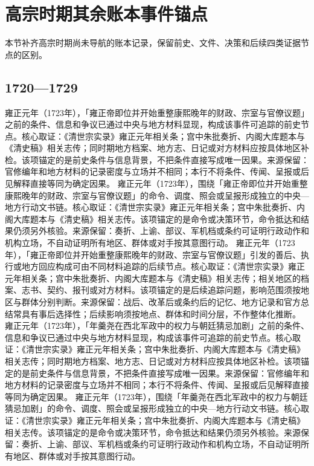 \section{高宗时期其余账本事件锚点}
本节补齐高宗时期尚未导航的账本记录，保留前史、文件、决策和后续四类证据节点的区别。
\subsection{1720—1729}
雍正元年（1723年），「雍正帝即位并开始重整康熙晚年的财政、宗室与官僚议题」之前的条件、信息和争议已通过中央与地方材料显现，构成该事件可追踪的前史节点。核心取证：《清世宗实录》雍正元年相关条；宫中朱批奏折、内阁大库题本与《清史稿》相关志传；同时期地方档案、地方志、日记或对方材料应按具体地区补检。该项锚定的是前史条件与信息背景，不把条件直接写成唯一因果。来源保留：官修编年和地方材料的记录密度与立场并不相同；本行不将条件、传闻、呈报或后见解释直接等同为确定因果。
雍正元年（1723年），围绕「雍正帝即位并开始重整康熙晚年的财政、宗室与官僚议题」的命令、调度、照会或呈报形成独立的中央—地方行动文书链。核心取证：《清世宗实录》雍正元年相关条；宫中朱批奏折、内阁大库题本与《清史稿》相关志传。该项锚定的是命令或决策环节，命令抵达和结果仍须另外核验。来源保留：奏折、上谕、部议、军机档或条约可证明行政动作和机构立场，不自动证明所有地区、群体或对手按其意图行动。
雍正元年（1723年），「雍正帝即位并开始重整康熙晚年的财政、宗室与官僚议题」引发的善后、执行或地方回应构成可由不同材料追踪的后续节点。核心取证：《清世宗实录》雍正元年相关条；宫中朱批奏折、内阁大库题本与《清史稿》相关志传；相关地区的档案、志书、契约、报刊或对方材料。该项锚定的是后续追踪问题，影响范围须按地区与群体分别判断。来源保留：战后、改革后或条约后的记忆、地方记录和官方总结常具有事后选择性；后续影响须按地点、群体和时间分层，不作整体化推断。
雍正元年（1723年），「年羹尧在西北军政中的权力与朝廷猜忌加剧」之前的条件、信息和争议已通过中央与地方材料显现，构成该事件可追踪的前史节点。核心取证：《清世宗实录》雍正元年相关条；宫中朱批奏折、内阁大库题本与《清史稿》相关志传；同时期地方档案、地方志、日记或对方材料应按具体地区补检。该项锚定的是前史条件与信息背景，不把条件直接写成唯一因果。来源保留：官修编年和地方材料的记录密度与立场并不相同；本行不将条件、传闻、呈报或后见解释直接等同为确定因果。
雍正元年（1723年），围绕「年羹尧在西北军政中的权力与朝廷猜忌加剧」的命令、调度、照会或呈报形成独立的中央—地方行动文书链。核心取证：《清世宗实录》雍正元年相关条；宫中朱批奏折、内阁大库题本与《清史稿》相关志传。该项锚定的是命令或决策环节，命令抵达和结果仍须另外核验。来源保留：奏折、上谕、部议、军机档或条约可证明行政动作和机构立场，不自动证明所有地区、群体或对手按其意图行动。
